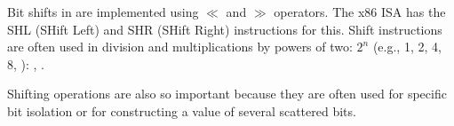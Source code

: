 \sectionold{\ShiftsSectionName}

Bit shifts in \CCpp are implemented using $\ll$ and $\gg$ operators.
The x86 \ac{ISA} has the SHL (SHift Left) and SHR (SHift Right) instructions for this.
Shift instructions are often used in division and multiplications by powers of two: $2^{n}$ (e.g., 1, 2, 4, 8, \etc{}):
,
.


Shifting operations are also so important because they are often used for specific bit isolation
or for constructing a value of several scattered bits.
